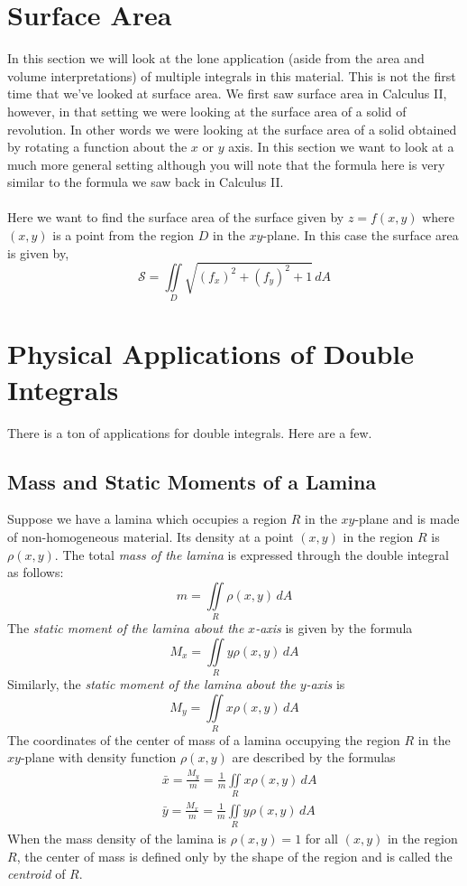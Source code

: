 \documentclass[10pt,reqno]{book}
\theoremstyle{definition}
\begin{document}
	\section{Surface Area}

	In this section we will look at the lone application (aside from the area and volume interpretations) of multiple integrals in this material. This is not the first time that we've looked at surface area. We first saw surface area in Calculus II, however, in that setting we were looking at the surface area of a solid of revolution. In other words we were looking at the surface area of a solid obtained by rotating a function about the $ x $ or $ y $ axis. In this section we want to look at a much more general setting although you will note that the formula here is very similar to the formula we saw back in Calculus II.\\ \\
	Here we want to find the surface area of the surface given by $ z = f(x,y) $ where $ (x,y) $ is a point from the region $ D $ in the $ xy $-plane. In this case the surface area is given by,
	\[ \mathcal{S} = \iint\limits_D \sqrt{(f_x)^2 + (f_y)^2 + 1}\,dA \]
	
	\section{Physical Applications of Double Integrals}
	
	There is a ton of applications for double integrals. Here are a few.
	
	\subsection*{Mass and Static Moments of a Lamina}
	
	Suppose we have a lamina which occupies a region $ R $ in the $ xy $-plane and is made of non-homogeneous material. Its density at a point $ (x,y) $ in the region $ R $ is $ \rho(x,y) $. The total \textit{mass of the lamina} is expressed through the double integral as follows:
	\[ m = \iint\limits_R \rho(x,y)\,dA \]
	The \textit{static moment of the lamina about the} $ x $\textit{-axis} is given by the formula
	\[ M_x = \iint\limits_R y\rho(x,y)\,dA \]
	Similarly, the \textit{static moment of the lamina about the} $ y $\textit{-axis} is
	\[ M_y = \iint\limits_R x\rho(x,y)\,dA \]
	The coordinates of the center of mass of a lamina occupying the region $ R $ in the $ xy $-plane with density function $ \rho(x,y) $ are described by the formulas
	\begin{align*}
		& \bar{x} = \frac{M_y}{m} =  \frac{1}{m} \iint\limits_R x\rho(x,y)\,dA\\
		& \bar{y} = \frac{M_x}{m} =  \frac{1}{m} \iint\limits_R y\rho(x,y)\,dA
	\end{align*}
	When the mass density of the lamina is $ \rho(x,y)=1 $ for all $ (x,y) $ in the region $ R $, the center of mass is defined only by the shape of the region and is called the \textit{centroid} of $ R $.
	
\end{document}
